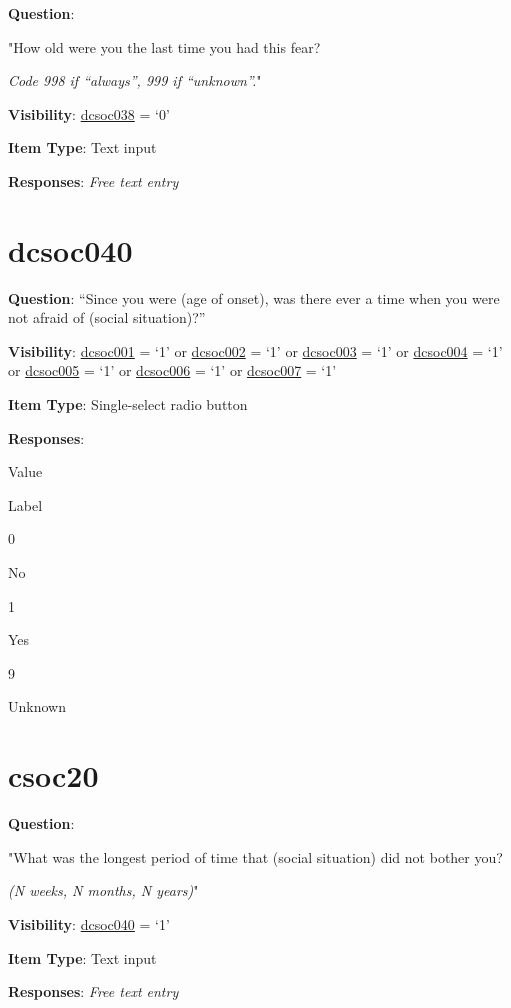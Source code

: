 \documentclass[]{book}
\begin{document}
\textbf{Question}:

"How old were you the last time you had this fear?

\emph{Code 998 if ``always'', 999 if ``unknown''.}"

\textbf{Visibility}: \protect\hyperlink{dcsoc038}{dcsoc038} = `0'

\textbf{Item Type}: Text input

\textbf{Responses}: \emph{Free text entry}

\hypertarget{dcsoc040}{%
\section{dcsoc040}\label{dcsoc040}}

\textbf{Question}: ``Since you were (age of onset), was there ever a time when you were not afraid of (social situation)?''

\textbf{Visibility}: \protect\hyperlink{dcsoc001}{dcsoc001} = `1' or \protect\hyperlink{dcsoc002}{dcsoc002} = `1' or \protect\hyperlink{dcsoc003}{dcsoc003} = `1' or \protect\hyperlink{dcsoc004}{dcsoc004} = `1' or \protect\hyperlink{dcsoc005}{dcsoc005} = `1' or \protect\hyperlink{dcsoc006}{dcsoc006} = `1' or \protect\hyperlink{dcsoc007}{dcsoc007} = `1'

\textbf{Item Type}: Single-select radio button

\textbf{Responses}:

Value

Label

0

No

1

Yes

9

Unknown

\hypertarget{csoc20}{%
\section{csoc20}\label{csoc20}}

\textbf{Question}:

"What was the longest period of time that (social situation) did not bother you?

\emph{(N weeks, N months, N years)}"

\textbf{Visibility}: \protect\hyperlink{dcsoc040}{dcsoc040} = `1'

\textbf{Item Type}: Text input

\textbf{Responses}: \emph{Free text entry}
\end{document}
